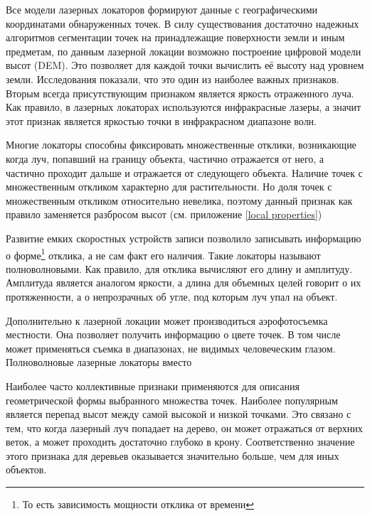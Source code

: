 \label{point properties}

Все модели лазерных локаторов формируют данные с географическими координатами обнаруженных точек. В силу существования достаточно надежных алгоритмов сегментации точек на принадлежащие поверхности земли и иным предметам, по данным лазерной локации возможно построение цифровой модели высот (DEM). Это позволяет для каждой точки вычислить её высоту над уровнем земли. Исследования
\cite{Amin}
показали, что это один из наиболее важных признаков.
Вторым всегда присутствующим признаком является яркость отраженного луча. Как правило, в лазерных локаторах используются инфракрасные лазеры, а значит этот признак является яркостью точки в инфракрасном диапазоне волн.

Многие локаторы способны фиксировать множественные отклики, возникающие когда луч, попавший на границу объекта, частично отражается от него, а частично проходит дальше и отражается от следующего объекта. Наличие точек с множественным откликом характерно для растительности. Но доля точек с множественным откликом относительно невелика, поэтому данный признак как правило заменяется разбросом высот (см. приложение \ref{local properties})

Развитие емких скоростных устройств записи позволило записывать информацию о форме\footnote{То есть зависимость мощности отклика от времени} отклика, а не сам факт его наличия. Такие локаторы называют полноволновыми. Как правило, для отклика вычисляют его длину и амплитуду. Амплитуда является аналогом яркости, а длина для объемных целей говорит о их протяженности, а о непрозрачных об угле, под которым луч упал на объект.

Дополнительно к лазерной локации может производиться аэрофотосъемка местности. Она позволяет получить информацию о цвете точек. В том числе может применяться съемка в диапазонах, не видимых человеческим глазом.
Полноволновые лазерные локаторы вместо 

\label{local properties}

Наиболее часто коллективные признаки применяются для описания геометрической формы выбранного множества точек. Наиболее популярным является перепад высот между самой высокой и низкой точками. Это связано с тем, что когда лазерный луч попадает на дерево, он может отражаться от верхних веток, а может проходить достаточно глубоко в крону. Соответственно значение этого признака для деревьев оказывается значительно больше, чем для иных объектов.

